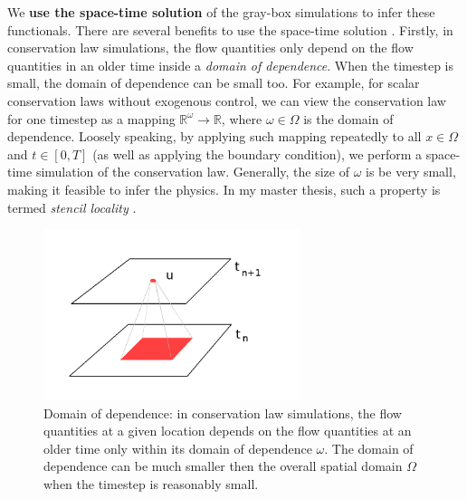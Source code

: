 \documentclass[a4paper,onecolumn]{article}
\theoremstyle{remark}
\begin{document}


\noindent We \textbf{use the space-time solution} of the gray-box simulations 
to infer these functionals.
There are several benefits to use the space-time solution \cite{hanmaster}.
Firstly, in conservation law simulations, the flow quantities only depend on the flow
quantities in an older time inside a \emph{domain of dependence}.
When the timestep is small,
the domain of dependence can be small too. For example, for scalar conservation laws 
without exogenous control,
we can view the conservation law for one timestep as a mapping 
$\mathbb{R}^\omega \rightarrow \mathbb{R}$, where $\omega\in \Omega$ is the domain of
dependence. 
Loosely speaking, by applying such mapping repeatedly to all $x\in \Omega$ and $t\in[0,T]$
(as well as applying the boundary condition), we perform 
a space-time simulation of the conservation law. Generally, the size of $\omega$ is be very small, 
making it feasible to infer the physics.
In my master thesis, such a property is termed \emph{stencil locality} \cite{hanmaster}.\\

\begin{figure}[H]\begin{center}
    \includegraphics[height=5cm]{locality.png}
    \caption{Domain of dependence: in conservation law simulations,
             the flow quantities at a given location
             depends on the flow quantities at an older time only within its
             domain of dependence $\omega$. The domain of dependence can be much smaller
             then the overall spatial domain $\Omega$ when the timestep is reasonably small.}
    \label{locality}
\end{center}\end{figure}
\end{document}
